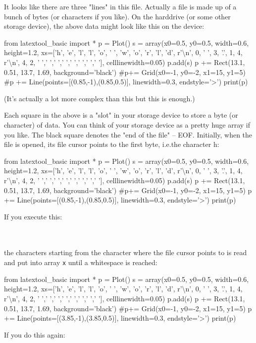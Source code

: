 \begin{consolethree}[escapeinside=||]
It looks like there are three "lines" in this file. Actually a file is made up of a bunch of bytes (or characters if you like). On the harddrive (or some other storage device), the above data might look like this on the device:
\begin{python}
from latextool_basic import *
p = Plot()
s = array(x0=0.5, y0=0.5, width=0.6, height=1.2, xs=['h', 'e', 'l', 'l', 'o', ' ', 'w', 'o', 'r', 'l', 'd', r'\textbackslash n', 0, ' ', 3, '.', 1, 4, r'\textbackslash  n', 4, 2, ' ',' ',' ',' ',' ',' ',' ',' '], celllinewidth=0.05)
p.add(s)
p += Rect(13.1, 0.51, 13.7, 1.69, background='black')
#p+= Grid(x0=-1, y0=-2, x1=15, y1=5)
#p += Line(points=[(0.85,-1),(0.85,0.5)], linewidth=0.3, endstyle='>')
print(p)
\end{python}

(It's actually a lot more complex than this but this is enough.)

Each square in the above is a "slot" in your storage device to store a byte (or character) of data. You can think of your storage device as a pretty huge array if you like. The black square denotes the "end of the file" -- EOF. Initially, when the file is opened, its file cursor points to the first byte, i.e.the character h:

\begin{python}
from latextool_basic import *
p = Plot()
s = array(x0=0.5, y0=0.5, width=0.6, height=1.2, xs=['h', 'e', 'l', 'l', 'o', ' ', 'w', 'o', 'r', 'l', 'd', r'\textbackslash n', 0, ' ', 3, '.', 1, 4, r'\textbackslash  n', 4, 2, ' ',' ',' ',' ',' ',' ',' ',' '], celllinewidth=0.05)
p.add(s)
p += Rect(13.1, 0.51, 13.7, 1.69, background='black')
#p+= Grid(x0=-1, y0=-2, x1=15, y1=5)
p += Line(points=[(0.85,-1),(0.85,0.5)], linewidth=0.3, endstyle='>')
print(p)
\end{python}
If you execute this:

\\
\\

the characters starting from the character where the file cursor points to is read and put into array \texttt{x} until a whitespace is reached:

\begin{python}
from latextool_basic import *
p = Plot()
s = array(x0=0.5, y0=0.5, width=0.6, height=1.2, xs=['h', 'e', 'l', 'l', 'o', ' ', 'w', 'o', 'r', 'l', 'd', r'\textbackslash n', 0, ' ', 3, '.', 1, 4, r'\textbackslash  n', 4, 2, ' ',' ',' ',' ',' ',' ',' ',' '], celllinewidth=0.05)
p.add(s)
p += Rect(13.1, 0.51, 13.7, 1.69, background='black')
#p+= Grid(x0=-1, y0=-2, x1=15, y1=5)
p += Line(points=[(3.85,-1),(3.85,0.5)], linewidth=0.3, endstyle='>')
print(p)
\end{python}
If you do this again:


\end{consolethree}
